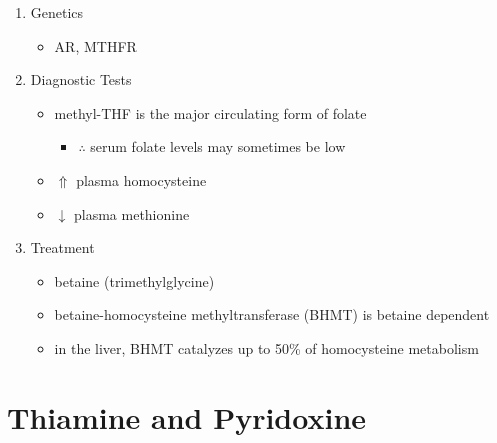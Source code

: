 \documentclass{scrartcl}
\begin{document}
\begin{enumerate}
\item Genetics
\label{sec:org10e7920}
\begin{itemize}
\item AR, MTHFR
\end{itemize}

\item Diagnostic Tests
\label{sec:org1485b69}
\begin{itemize}
\item methyl-THF is the major circulating form of folate
\begin{itemize}
\item \(\therefore\) serum folate levels may sometimes be low
\end{itemize}
\item \(\Uparrow\) plasma homocysteine
\item \(\downarrow\) plasma methionine
\end{itemize}

\item Treatment
\label{sec:orged22322}
\begin{itemize}
\item betaine (trimethylglycine)
\item betaine-homocysteine methyltransferase (BHMT) is betaine dependent
\end{itemize}
\begin{itemize}
\item in the liver, BHMT catalyzes up to 50\% of homocysteine metabolism
\end{itemize}
\end{enumerate}

\section{Thiamine and Pyridoxine}
\label{sec:orge765803}
\end{document}

